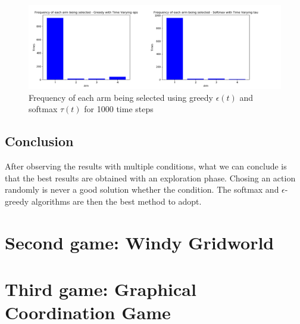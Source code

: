 \documentclass{article}
\begin{document}
\begin{figure}[H]
  \centering
  \includegraphics[scale=1.3]{fig/bandit3-counters.png}
  \caption{Frequency of each arm being selected using greedy $\epsilon (t)$ and softmax $\tau (t)$ for 1000 time steps}
  \label{fig:bandit3-counters}
\end{figure}

\subsection{Conclusion}
After observing the results with multiple conditions, what we can conclude is that the best results are obtained with an exploration phase. Chosing an action randomly is never a good solution whether the condition. The softmax and $\epsilon$-greedy algorithms are then the best method to adopt. 


\section{Second game: Windy Gridworld}

\section{Third game: Graphical Coordination Game}
\end{document}

